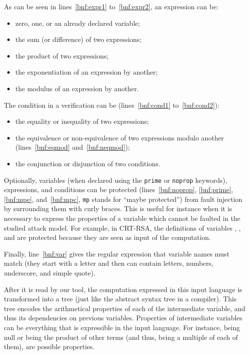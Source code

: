 \documentclass[10pt]{article}
\theoremstyle{definition}
\theoremstyle{theorem}
\begin{document}
\noindent
As can be seen in lines~\ref{bnf:expr1} to~\ref{bnf:expr2}, an expression can be:
\begin{itemize}
\item zero, one, or an already declared variable;
\item the sum (or difference) of two expressions;
\item the product of two expressions;
\item the exponentiation of an expression by another;
\item the modulus of an expression by another.
\end{itemize}

\noindent
The condition in a verification can be (lines~\ref{bnf:cond1} to~\ref{bnf:cond2}):
\begin{itemize}
\item the equality or inequality of two expressions;
\item the equivalence or non-equivalence of two expressions modulo another (lines~\ref{bnf:eqmod} and~\ref{bnf:neqmod});
\item the conjunction or disjunction of two conditions.
\end{itemize}

Optionally, variables (when declared using the {\tt prime} or {\tt noprop} keywords), expressions, and conditions can be protected (lines~\ref{bnf:noprop}, \ref{bnf:prime}, \ref{bnf:mpe}, and~\ref{bnf:mpc}, {\tt mp} stands for ``maybe protected'') from fault injection by surrounding them with curly braces.
This is useful for instance when it is necessary to express the properties of a variable which cannot be faulted in the studied attack model.
For example, in CRT-RSA, the definitions of variables , , and  are protected because they are seen as input of the computation.

Finally, line~\ref{bnf:var} gives the regular expression that variable names must match (they start with a letter and then can contain letters, numbers, underscore, and simple quote).

\medskip

After it is read by our tool, the computation expressed in this input language is transformed into a tree (just like the abstract syntax tree in a compiler).
This tree encodes the arithmetical properties of each of the intermediate variable, and thus its dependencies on previous variables.
Properties of intermediate variables can be everything that is expressible in the input language.
For instance, being null or being the product of other terms (and thus, being a multiple of each of them), are possible properties.
\end{document}

